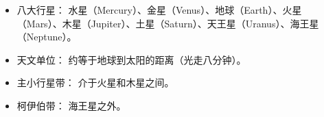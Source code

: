 
\begin{issues}
\issueDraft
\end{issues}

\begin{itemize}
\item 八大行星： 水星（Mercury）、金星（Venus）、地球（Earth）、火星（Mars）、木星（Jupiter）、土星（Saturn）、天王星（Uranus）、海王星（Neptune）。
\item 天文单位： 约等于地球到太阳的距离（光走八分钟）。
\item 主小行星带： 介于火星和木星之间。
\item 柯伊伯带： 海王星之外。
\end{itemize}

